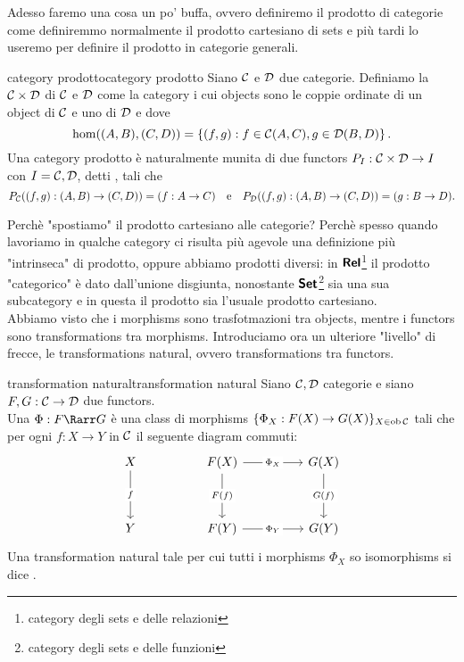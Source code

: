 \documentclass{article}
\renewcommand\C{\mc{C}}
\newcommand\D{\mc{D}}
\begin{document}
Adesso faremo una cosa un po' buffa, ovvero definiremo il prodotto di categorie come definiremmo normalmente il prodotto cartesiano di sets e più tardi lo useremo per definire il prodotto in categorie generali.

\begin{definition}{category prodotto}{category prodotto}
    Siano $\C$ e $\D$ due categorie. Definiamo la  $\C\times\D$ di $\C$ e $\D$ come la category i cui objects sono le coppie ordinate di un object di $\C$ e uno di $\D$ e dove
    \[ \hom((A,B),(C,D)) = \left\{ (f,g) : f \in \C(A,C), g \in \D(B,D) \right\}. \]
    Una category prodotto è naturalmente munita di due functors $P_I : \C\times\D\to I$ con $I = \C,\D$, detti , tali che
    \[ P_\C ((f,g):(A,B)\to(C,D)) = (f:A\to C) \quad\text{e}\quad P_\D ((f,g):(A,B)\to(C,D)) = (g:B\to D). \]
\end{definition}

Perchè "spostiamo" il prodotto cartesiano alle categorie? Perchè spesso quando lavoriamo in qualche category ci risulta più agevole una definizione più "intrinseca" di prodotto, oppure abbiamo prodotti diversi: in $\text{\sffamily\textbf{Rel}}$\footnote{category degli sets e delle relazioni} il prodotto "categorico" è dato dall'unione disgiunta, nonostante $\text{\sffamily\textbf{Set}}$\footnote{category degli sets e delle funzioni} sia una sua subcategory e in questa il prodotto sia l'usuale prodotto cartesiano.\\
Abbiamo visto che i morphisms sono trasfotmazioni tra objects, mentre i functors sono transformations tra morphisms. Introduciamo ora un ulteriore "livello" di frecce, le transformations natural, ovvero transformations tra functors.

\begin{definition}{transformation natural}{transformation natural}
    Siano $\C,\D$ categorie e siano $F,G : \C\to\D $ due functors.\\
    Una  $\Phi:F\Rarr G$ è una class di morphisms $\{\Phi_X : F(X)\to G(X)\}_{X\in\ob\C}$ tali che per ogni $f:X\to Y$ in $\C$ il seguente diagram commuti:
    \[\begin{tikzcd}
    	X && {F(X)} && {G(X)} \\
    	\\
    	Y && {F(Y)} && {G(Y)}
    	\arrow["f"{description}, from=1-1, to=3-1]
    	\arrow["{\Phi_X}"{description}, from=1-3, to=1-5]
    	\arrow["{F(f)}"{description}, from=1-3, to=3-3]
    	\arrow["{G(f)}"{description}, from=1-5, to=3-5]
	    \arrow["{\Phi_Y}"{description}, from=3-3, to=3-5]
    \end{tikzcd}\]
    Una transformation natural tale per cui tutti i morphisms $\Phi_X$ so isomorphisms si dice .
\end{definition}
\end{document}
